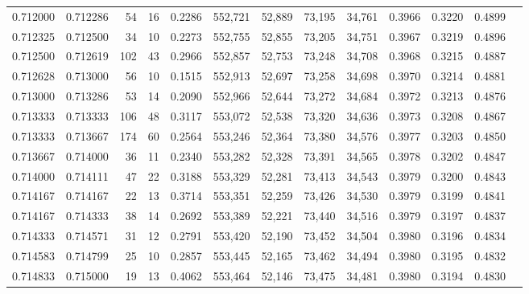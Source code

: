 \begin{tabular}{rrrrrrrrrrrrr}
0.712000 & 0.712286 &    54 &  16 &                                     0.2286 & 552,721 &  52,889 &  73,195 &  34,761 & 0.3966 & 0.3220 & 0.4899 \\
0.712325 & 0.712500 &    34 &  10 &                                     0.2273 & 552,755 &  52,855 &  73,205 &  34,751 & 0.3967 & 0.3219 & 0.4896 \\
0.712500 & 0.712619 &   102 &  43 &                                     0.2966 & 552,857 &  52,753 &  73,248 &  34,708 & 0.3968 & 0.3215 & 0.4887 \\
0.712628 & 0.713000 &    56 &  10 &                                     0.1515 & 552,913 &  52,697 &  73,258 &  34,698 & 0.3970 & 0.3214 & 0.4881 \\
0.713000 & 0.713286 &    53 &  14 &                                     0.2090 & 552,966 &  52,644 &  73,272 &  34,684 & 0.3972 & 0.3213 & 0.4876 \\
0.713333 & 0.713333 &   106 &  48 &                                     0.3117 & 553,072 &  52,538 &  73,320 &  34,636 & 0.3973 & 0.3208 & 0.4867 \\
0.713333 & 0.713667 &   174 &  60 &                                     0.2564 & 553,246 &  52,364 &  73,380 &  34,576 & 0.3977 & 0.3203 & 0.4850 \\
0.713667 & 0.714000 &    36 &  11 &                                     0.2340 & 553,282 &  52,328 &  73,391 &  34,565 & 0.3978 & 0.3202 & 0.4847 \\
0.714000 & 0.714111 &    47 &  22 &                                     0.3188 & 553,329 &  52,281 &  73,413 &  34,543 & 0.3979 & 0.3200 & 0.4843 \\
0.714167 & 0.714167 &    22 &  13 &                                     0.3714 & 553,351 &  52,259 &  73,426 &  34,530 & 0.3979 & 0.3199 & 0.4841 \\
0.714167 & 0.714333 &    38 &  14 &                                     0.2692 & 553,389 &  52,221 &  73,440 &  34,516 & 0.3979 & 0.3197 & 0.4837 \\
0.714333 & 0.714571 &    31 &  12 &                                     0.2791 & 553,420 &  52,190 &  73,452 &  34,504 & 0.3980 & 0.3196 & 0.4834 \\
0.714583 & 0.714799 &    25 &  10 &                                     0.2857 & 553,445 &  52,165 &  73,462 &  34,494 & 0.3980 & 0.3195 & 0.4832 \\
0.714833 & 0.715000 &    19 &  13 &                                     0.4062 & 553,464 &  52,146 &  73,475 &  34,481 & 0.3980 & 0.3194 & 0.4830 \\

\end{tabular}
